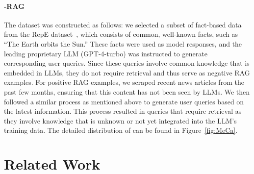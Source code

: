 \paragraph{\dname-RAG}
The dataset was constructed as follows: we selected a subset of fact-based data from the RepE dataset~\citep{zou2023representation}, which consists of common, well-known facts, such as “The Earth orbits the Sun.” These facts were used as model responses, and the leading proprietary LLM (\ie GPT-4-turbo) was instructed to generate corresponding user queries. Since these queries involve common knowledge that is embedded in LLMs, they do not require retrieval and thus serve as negative RAG examples. For positive RAG examples, we scraped recent news articles from the past few months, ensuring that this content has not been seen by LLMs. We then followed a similar process as mentioned above to generate user queries based on the latest information. This process resulted in queries that require retrieval as they involve knowledge that is unknown or not yet integrated into the LLM's training data. The detailed distribution of \dname can be found in Figure~\ref{fig:MeCa}.




\section{Related Work}

